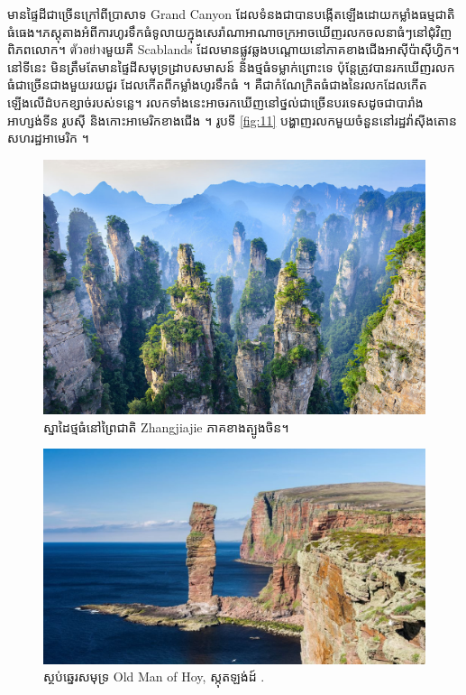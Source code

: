 \documentclass[10pt,twocolumn,letterpaper]{article}
\begin{document}
មាន​ផ្ទៃដី​ជាច្រើន​ក្រៅពី​ប្រាសាទ Grand Canyon ដែល​ទំនងជា​បានបង្កើត​ឡើង​ដោយ​កម្លាំង​ធម្មជាតិ​ធំធេង។​ ភស្តុតាង​អំពី​ការហូរទឹក​ធំទូលាយ​ក្នុង​សេរ៉ាណា​អាណាចក្រ​អាចឃើញ​រលក​ចលនា​ធំៗ​នៅជុំវិញ​ពិភពលោក។ ตัวอย่าง​មួយ​គឺ Scablands ដែល​មាន​ផ្លូវឆ្លង​បណ្ដោយ​នៅ​ភាគ​ខាងជើង​អាស៊ីប៉ាស៊ីហ្វិក។ នៅទីនេះ មិនត្រឹមតែមាន​ផ្ទៃដី​សមុទ្រដ្រាប​សមាសន៍ និង​ថ្ម​ធំ​ទម្លាក់ព្រោះ​ទេ ប៉ុន្តែ​ត្រូវ​បានរកឃើញ​រលក​ធំជាច្រើន​ជាង​មួយរយជួរ ដែលកើតពី​កម្លាំងហូរទឹក​ធំ \cite{78,79}។ គឺជា​កំណែក្រិត​ធំជាង​នៃ​រលក​ដែលកើតឡើងលើ​ដំបកខ្សាច់របស់​ទន្លេ។ រលកទាំងនេះអាច​រកឃើញ​នៅថ្នល់ជាច្រើន​បរទេស​ដូចជា​បារាំង អាហ្សង់ទីន រូបស៊ី និង​កោះអាមេរិកខាង​ជើង \cite{81}។ រូបទី \ref{fig:11} បង្ហាញ​រលក​មួយ​ចំនួន​នៅ​រដ្ឋវ៉ាស៊ីងតោន សហរដ្ឋអាមេរិក \cite{80}។

\begin{figure}[b]
\begin{center}
   \includegraphics[width=1\linewidth]{zhangjiajie.jpg}
\end{center}
   \caption{ស្នាដៃ​ថ្មធំនៅ​ព្រៃជាតិ Zhangjiajie ភាគខាងត្បូង​ចិន។}
\label{fig:12}
\label{fig:onecol}
\end{figure}

\begin{figure}[b]
\begin{center}

   \includegraphics[width=1\linewidth]{hoy.jpg}
\end{center}
   \caption{ស្ថប់ឆ្នេរសមុទ្រ Old Man of Hoy, ស្កុតឡង់ដ៍ \cite{83}.}
\label{fig:13}
\label{fig:onecol}
\end{figure}
\end{document}

